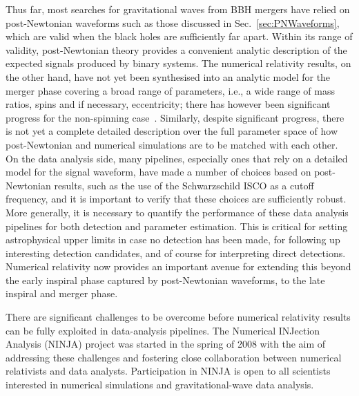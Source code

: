 \newcommand{\Ytwo}{{{}^{-2}Y}}

\newcommand\T{}
\newcommand\B{}
\newcommand\TT{}
\newcommand\BB{}
\newcommand\TTT{}



Thus far, most searches for gravitational waves from BBH mergers have
relied on post-Newtonian waveforms such as those discussed in
Sec.~\ref{sec:PNWaveforms}, which are valid when the black holes
are sufficiently far apart.  Within its range of validity,
post-Newtonian theory provides a convenient analytic description of
the expected signals produced by binary systems.  The numerical
relativity results, on the other hand, have not yet been synthesised
into an analytic model for the merger phase covering a broad range of
parameters, i.e., a wide range of mass ratios, spins and if necessary,
eccentricity; there has however been significant progress for the
non-spinning
case~\cite{Buonanno:2006ui,Berti:2007fi,Ajith:2007kx,Pan:2007nw,%
Buonanno:2007pf,Boyle:2007ft,%
Ajith:2007qp,Damour:2007yf,Damour:2007vq,Damour:2008te,Boyle:2008ge,Boyle:2009dg}.
Similarly, despite significant progress, there is not yet a complete
detailed description over the full parameter space of how
post-Newtonian and numerical simulations are to be matched with each
other.  On the data analysis side, many pipelines, especially ones
that rely on a detailed model for the signal waveform, have made a
number of choices based on post-Newtonian results, such as the use of
the Schwarzschild ISCO as a cutoff frequency, and it is important to
verify that these choices are sufficiently robust.  More generally, it
is necessary to quantify the performance of these data analysis
pipelines for both detection and parameter estimation.  This is
critical for setting astrophysical upper limits in case no detection
has been made, for following up interesting detection candidates, and
of course for interpreting direct detections.  Numerical relativity
now provides an important avenue for extending this beyond the early
inspiral phase captured by post-Newtonian waveforms, to the late
inspiral and merger phase.  

There are significant challenges to be overcome before numerical
relativity results can be fully exploited in data-analysis pipelines.
The Numerical INJection Analysis (NINJA) project was started in the
spring of 2008 with the aim of addressing these challenges and
fostering close collaboration between numerical relativists and data
analysts. Participation in NINJA is open to all scientists interested
in numerical simulations and gravitational-wave data analysis.  

